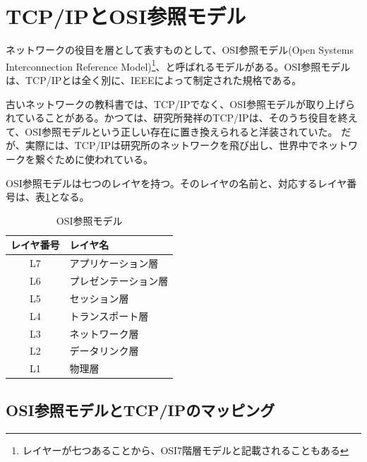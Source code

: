 \section{TCP/IPとOSI参照モデル}
ネットワークの役目を層として表すものとして、OSI参照モデル(Open Systems Interconnection Reference Model)\footnote{レイヤーが七つあることから、OSI7階層モデルと記載されることもある}、と呼ばれるモデルがある。OSI参照モデルは、TCP/IPとは全く別に、IEEEによって制定された規格である。

古いネットワークの教科書では、TCP/IPでなく、OSI参照モデルが取り上げられていることがある。かつては、研究所発祥のTCP/IPは、そのうち役目を終えて、OSI参照モデルという正しい存在に置き換えられると洋装されていた。
だが、実際には、TCP/IPは研究所のネットワークを飛び出し、世界中でネットワークを繋ぐために使われている。

OSI参照モデルは七つのレイヤを持つ。そのレイヤの名前と、対応するレイヤ番号は、表\ref{osirm}となる。

\begin{table}[hbtp] 
\begin{center} \label{osirm}
	\begin{tabular}{cl} \toprule 
		レイヤ番号 & レイヤ名 \\ \midrule
		L7 & アプリケーション層 \\
		L6 & プレゼンテーション層 \\
		L5 & セッション層 \\
		L4 & トランスポート層 \\
		L3 & ネットワーク層 \\
		L2 & データリンク層 \\
		L1 & 物理層 \\ \bottomrule
	\end{tabular}
\end{center} \caption{OSI参照モデル}
\end{table} 

\subsection{OSI参照モデルとTCP/IPのマッピング}

